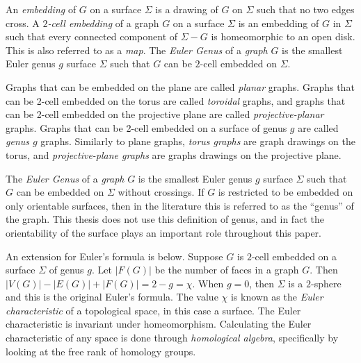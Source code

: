 An \textit{embedding} of $G$ on a surface $\Sigma$ is a drawing of $G$ on $\Sigma$ such that no two edges cross. 
A \textit{$2$-cell embedding} of a graph $G$ on a surface $\Sigma$ is an embedding of $G$ in $\Sigma$ such that every connected component of $\Sigma - G$ is homeomorphic to an open disk. This is also referred to as a \textit{map}. The \textit{Euler Genus} of a \textit{graph} \(G\) is the smallest Euler genus \(g\) surface \(\Sigma\) such that \(G\) can be $2$-cell embedded on $\Sigma$.

Graphs that can be embedded on the plane are called \textit{planar} graphs. Graphs that can be 2-cell embedded on the torus are called \textit{toroidal} graphs, and graphs that can be 2-cell embedded on the projective plane are called \textit{projective-planar} graphs. Graphs that can be 2-cell embedded on a surface of genus $g$ are called \textit{genus $g$} graphs. Similarly to plane graphs, \textit{torus graphs} are graph drawings on the torus, and \textit{projective-plane graphs} are graphs drawings on the projective plane. 

The \textit{Euler Genus} of a \textit{graph} \(G\) is the smallest Euler genus \(g\) surface \(\Sigma\) such that \(G\) can be embedded on \(\Sigma\) without crossings. If $G$ is restricted to be embedded on only orientable surfaces, then in the literature this is referred to as the ``genus'' of the graph. This thesis does not use this definition of genus, and in fact the orientability of the surface plays an important role throughout this paper.

An extension for Euler's formula is below. Suppose $G$ is $2$-cell embedded on a surface $\Sigma$ of genus $g$. Let \(|F(G)|\) be the number of faces in a graph \(G\). Then \(|V(G)| - |E(G)| + |F(G)| = 2 - g = \chi\). When $g = 0$, then $\Sigma$ is a $2$-sphere and this is the original Euler's formula. 
The value $\chi$ is known as the \textit{Euler characteristic} of a topological space, in this case a surface. The Euler characteristic is invariant under homeomorphism. Calculating the Euler characteristic of any space is done through \textit{homological algebra}, specifically by looking at the free rank of homology groups. 


